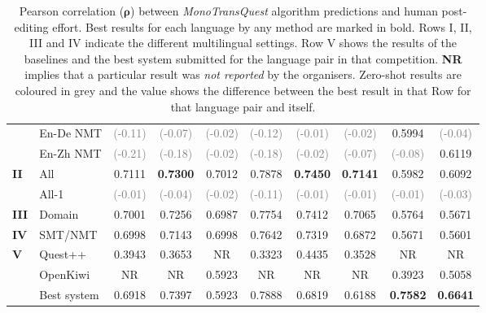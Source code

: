 \begin{table}[t]
\begin{center}
{\begin{tabular}{l l c c c c c c c c}
				& En-De NMT & \textcolor{gray}{(-0.11)} &  \textcolor{gray}{(-0.07)} & \textcolor{gray}{(-0.02)} & \textcolor{gray}{(-0.12)} & \textcolor{gray}{(-0.01)}  & \textcolor{gray}{(-0.02)} & 0.5994 &  \textcolor{gray}{(-0.04)} \\
				& En-Zh NMT & \textcolor{gray}{(-0.21)} &  \textcolor{gray}{(-0.18)} & \textcolor{gray}{(-0.02)} & \textcolor{gray}{(-0.18)} & \textcolor{gray}{(-0.02)}  & \textcolor{gray}{(-0.07)} & \textcolor{gray}{(-0.08)} & 0.6119 \\
				\midrule
				\multirow{2}{*}{\bf II} & All & 0.7111 &  \textbf{0.7300} & 0.7012 & 0.7878 & \textbf{0.7450} & \textbf{0.7141} & 0.5982 & 0.6092\\
				& All-1 & \textcolor{gray}{(-0.01)} &  \textcolor{gray}{(-0.04)} & \textcolor{gray}{(-0.02)} & \textcolor{gray}{(-0.11)} & \textcolor{gray}{(-0.01)} & \textcolor{gray}{(-0.01)} & \textcolor{gray}{(-0.01)} & \textcolor{gray}{(-0.03)} \\
				\midrule
				\multirow{1}{*}{\bf III} & Domain & 0.7001 &  0.7256 & 0.6987 & 0.7754 & 0.7412 & 0.7065  & 0.5764 &  0.5671 \\
				\midrule
				\multirow{1}{*}{\bf IV} & SMT/NMT & 0.6998 &  0.7143 & 0.6998 & 0.7642 & 0.7319 & 0.6872 & 0.5671 & 0.5601 \\
				\midrule
				\multirow{3}{*}{\bf V} & Quest++ & 0.3943 &  0.3653 & NR & 0.3323 & 0.4435 & 0.3528 & NR & NR \\
				& OpenKiwi & NR &  NR & 0.5923 & NR & NR & NR & 0.3923 & 0.5058 \\
				& Best system & 0.6918 &  0.7397 & 0.5923 & 0.7888 & 0.6819 & 0.6188 & \textbf{0.7582} & \textbf{0.6641} \\
				\bottomrule
			\end{tabular}
		}
	\end{center}
\caption[Pearson correlation between MonoTransQuest algorithm predictions and human post-editing effort]{Pearson correlation ($\bm{\rho}$) between \textit{MonoTransQuest} algorithm predictions and human post-editing effort. Best results for each language by any method are marked in bold. Rows I, II, III and IV indicate the different multilingual settings. Row V shows the results of the baselines and the best system submitted for the language pair in that competition. \textbf{NR} implies that a particular result was \textit{not reported} by the organisers. Zero-shot results are coloured in grey and the value shows the difference between the best result in that Row for that language pair and itself.} 
	\label{tab:multilingual_hter}
\end{table}


